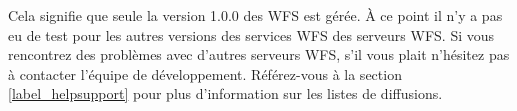 Cela signifie que seule la version 1.0.0 des WFS est gérée. À ce point il n'y a pas eu de test pour les autres versions des services WFS des serveurs WFS.
Si vous rencontrez des problèmes avec d'autres serveurs WFS, s'il vous plait n'hésitez  pas à contacter l'équipe de développement. Référez-vous à la section  \ref{label_helpsupport} pour plus d'information sur les listes de diffusions.


